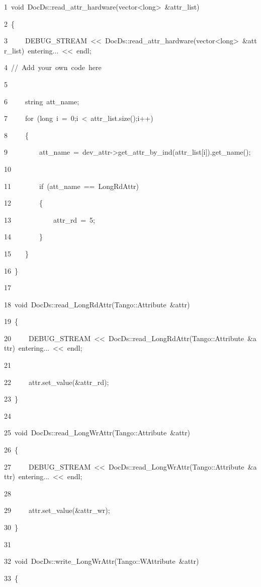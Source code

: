 
\begin{lyxcode}
1~void~DocDs::read\_attr\_hardware(vector<long>~\&attr\_list)

2~\{

3~~~~~DEBUG\_STREAM~<\textcompwordmark{}<~\textquotedbl{}DocDs::read\_attr\_hardware(vector<long>~\&attr\_list)~entering...~\textquotedbl{}<\textcompwordmark{}<~endl;

4~//~Add~your~own~code~here

5~

6~~~~~string~att\_name;

7~~~~~for~(long~i~=~0;i~<~attr\_list.size();i++)

8~~~~~\{

9~~~~~~~~~att\_name~=~dev\_attr->get\_attr\_by\_ind(attr\_list{[}i{]}).get\_name();

10~

11~~~~~~~~if~(att\_name~==~\textquotedbl{}LongRdAttr\textquotedbl{})

12~~~~~~~~\{

13~~~~~~~~~~~~attr\_rd~=~5;

14~~~~~~~~\}

15~~~~\}

16~\}

17~

18~void~DocDs::read\_LongRdAttr(Tango::Attribute~\&attr)

19~\{

20~~~~~DEBUG\_STREAM~<\textcompwordmark{}<~\textquotedbl{}DocDs::read\_LongRdAttr(Tango::Attribute~\&attr)~entering...~\textquotedbl{}<\textcompwordmark{}<~endl;

21~

22~~~~~attr.set\_value(\&attr\_rd);

23~\}

24~

25~void~DocDs::read\_LongWrAttr(Tango::Attribute~\&attr)

26~\{

27~~~~~DEBUG\_STREAM~<\textcompwordmark{}<~\textquotedbl{}DocDs::read\_LongWrAttr(Tango::Attribute~\&attr)~entering...~\textquotedbl{}<\textcompwordmark{}<~endl;

28~

29~~~~~attr.set\_value(\&attr\_wr);

30~\}

31~

32~void~DocDs::write\_LongWrAttr(Tango::WAttribute~\&attr)

33~\{


\end{lyxcode}
